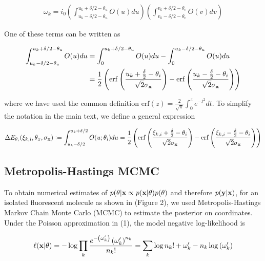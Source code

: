 \documentclass{article}
\begin{document}
\begin{align*}
\omega_{k} = i_{0}\left(\int_{u_{k}-\delta /2 - \theta_{u}}^{u_{k}+\delta /2 - \theta_{u}} O(u)du \right)\left(\int_{v_{k}-\delta /2 - \theta_{v}}^{v_{k}+\delta /2 - \theta_{v}} O(v)dv \right)
\end{align*}

One of these terms can be written as 

\begin{align*}
\int_{u_{k}-\delta /2 - \theta_{u}}^{u_{k}+\delta /2 - \theta_{u}} O(u)du &= \int_{0}^{u_{k}+\delta /2 - \theta_{u}} O(u)du - \int_{0}^{u_{k}-\delta /2 - \theta_{u}} O(u)du\\
&= \frac{1}{2}\left(\mathrm{erf}\left(\frac{u_{k}+\frac{\delta}{2}-\theta_{i}}{\sqrt{2}\sigma_{\bold{x}}}\right) -\mathrm{erf}\left(\frac{u_{k}-\frac{\delta}{2}-\theta_{i}}{\sqrt{2}\sigma_{\bold{x}}}\right)\right)
\end{align*}

where we have used the common definition $\mathrm{erf}(z) = \frac{2}{\sqrt{\pi}}\int_{0}^{z}e^{-t^{2}}dt$. To simplify the notation in the main text, we define a general expression

\begin{equation*}
\Delta E_{\theta_{i}}(\xi_{k,i},\theta_{x},\sigma_{\bold{x}}) \vcentcolon = \int_{u_{k}-\delta /2}^{u_{k}+\delta /2} O(u;\theta_{i})du = \frac{1}{2}\left(\mathrm{erf}\left(\frac{\xi_{k,i}+\frac{\delta}{2}-\theta_{i}}{\sqrt{2}\sigma_{\bold{x}}}\right) -\mathrm{erf}\left(\frac{\xi_{k,i}-\frac{\delta}{2}-\theta_{i}}{\sqrt{2}\sigma_{\bold{x}}}\right)\right)
\end{equation*}

\subsection{Metropolis-Hastings MCMC}

To obtain numerical estimates of $p(\theta|\bold{x}\propto p(\bold{x}|\theta)p(\theta)$ and therefore $p(\bold{y}|\bold{x})$, for an isolated fluorescent molecule as shown in (Figure 2), we used Metropolis-Hastings Markov Chain Monte Carlo (MCMC) to estimate the posterior on coordinates. Under the Poisson approximation in (1), the model negative log-likelihood is

\begin{equation}
\ell(\bold{x}|\theta) = -\log \prod_{k} \frac{e^{-\left(\omega_{k}'\right)}\left(\omega_{k}'\right)^{n_{k}}}{n_{k}!} = \sum_{k}  \log n_{k}! + \omega_{k}' - n_{k}\log\left(\omega_{k}'\right)
\end{equation}
\end{document}
